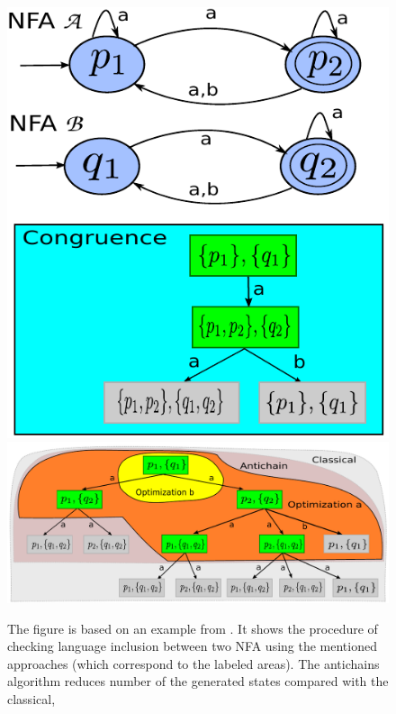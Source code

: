 \begin{figure}[th]
\begin{center}
	\scalebox{1}
	{
		\includegraphics[scale=0.5]{fig/congr1.pdf}
		\hspace{0.55cm}
  	\includegraphics[scale=0.5]{fig/ac1.pdf}
	}
  \caption{
      \rm{
      \hspace{0.1cm} The figure is based on an example from \cite{tacas10}.
      It shows the procedure of checking language inclusion between two NFA using the mentioned approaches (which correspond to the labeled areas).
      The antichains algorithm reduces number of the generated states compared with the classical,
}}
\end{center}
\end{figure}
